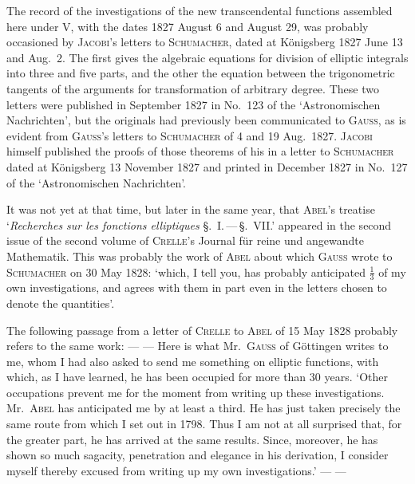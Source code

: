The record of the investigations of the new transcendental functions assembled here under V, with the dates 1827 August 6 and August 29, was probably occasioned by \textsc{Jacobi}’s letters to \textsc{Schumacher}, dated at Königsberg 1827 June 13 and Aug.\ 2. The first gives the algebraic equations for division of elliptic integrals into three and five parts, and the other the equation between the trigonometric tangents of the arguments for transformation of arbitrary degree. These two letters were published in September 1827 in No.\ 123 of the ‘Astronomischen Nachrichten’, but the originals had previously been communicated to \textsc{Gauss}, as is evident from \textsc{Gauss}’s letters to \textsc{Schumacher} of 4 and 19 Aug.\ 1827. \textsc{Jacobi} himself published the proofs of those theorems of his in a letter to \textsc{Schumacher} dated at Königsberg 13 November 1827 and printed in December 1827 in No.\ 127 of the ‘Astronomischen Nachrichten’.

It was not yet at that time, but later in the same year, that \textsc{Abel}’s treatise ‘\textit{Recherches sur les fonctions elliptiques} \S.\ I.\,---\,\S.\ VII.’ appeared in the second issue of the second volume of \textsc{Crelle}’s Journal für reine und angewandte Mathematik. This was probably the work of \textsc{Abel} about which \textsc{Gauss} wrote to \textsc{Schumacher} on 30 May 1828: ‘which, I tell you, has probably anticipated \(\frac{1}{3}\) of my own investigations, and agrees with them in part even in the letters chosen to denote the quantities’.

The following passage from a letter of \textsc{Crelle} to \textsc{Abel} of 15 May 1828 probably refers to the same work: --- --- Here is what Mr.\ \textsc{Gauss} of Göttingen writes to me, whom I had also asked to send me something on elliptic functions, with which, as I have learned, he has been occupied for more than 30 years. ‘Other occupations prevent me for the moment from writing up these investigations. Mr.\ \textsc{Abel} has anticipated me by at least a third. He has just taken precisely the same route from which I set out in 1798. Thus I am not at all surprised that, for the greater part, he has arrived at the same results. Since, moreover, he has shown so much sagacity, penetration and elegance in his derivation, I consider myself thereby excused from writing up my own investigations.’ --- ---


